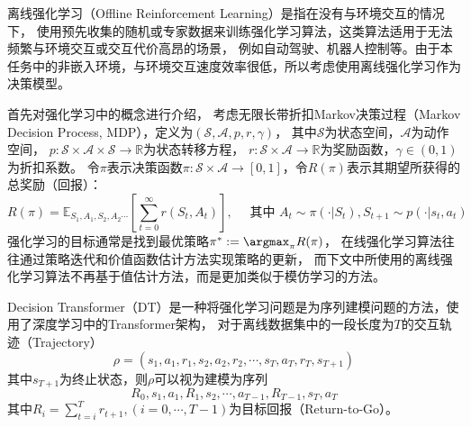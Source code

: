 
\label{sec-offline-rl}
离线强化学习（Offline Reinforcement Learning）是指在没有与环境交互的情况下，
使用预先收集的随机或专家数据来训练强化学习算法，这类算法适用于无法频繁与环境交互或交互代价高昂的场景，
例如自动驾驶、机器人控制等。由于本任务中的非嵌入环境，与环境交互速度效率很低，所以考虑使用离线强化学习作为决策模型。

首先对强化学习中的概念进行介绍，
考虑无限长带折扣Markov决策过程（Markov Decision Process, MDP），定义为$(\mathcal{S},\mathcal{A},p,r,\gamma)$，
其中$\mathcal{S}$为状态空间，$\mathcal{A}$为动作空间，
$p:\mathcal{S}\times \mathcal{A}\times \mathcal{S}\to \mathbb{R}$为状态转移方程，
$r:\mathcal{S}\times\mathcal{A}\to \mathbb{R}$为奖励函数，$\gamma\in(0,1)$为折扣系数。
令$\pi$表示决策函数$\pi: \mathcal{S}\times \mathcal{A}\to [0,1]$，令$R(\pi)$表示其期望所获得的总奖励（回报）：
\begin{equation}
  R(\pi) = \mathbb{E}_{S_1,A_1,S_2,A_2\cdots}\left[\sum_{t=0}^{\infty}r(S_t,A_t)\right],\quad
  \text{~其中~}A_t\sim\pi(\cdot|S_t),S_{t+1}\sim p(\cdot|s_t,a_t)
\end{equation}
强化学习的目标通常是找到最优策略$\pi^* := \argmax_{\pi}R(\pi)$，
在线强化学习算法往往通过策略迭代和价值函数估计方法实现策略的更新，
而下文中所使用的离线强化学习算法不再基于值估计方法，而是更加类似于模仿学习的方法。

Decision Transformer（DT）是一种将强化学习问题是为序列建模问题的方法，使用了深度学习中的Transformer架构，
对于离线数据集中的一段长度为$T$的交互轨迹（Trajectory）
\begin{equation}
  \rho = (s_1,a_1,r_1,s_2,a_2,r_2,\cdots,s_T,a_T,r_T,s_{T+1})
\end{equation}
其中$s_{T+1}$为终止状态，则$\rho$可以视为建模为序列
\begin{equation}\label{eq-sequence}
  R_0,s_1,a_1,R_1,s_2,\cdots,a_{T-1},R_{T-1},s_{T},a_{T}
\end{equation}
其中$R_i=\sum_{t=i}^Tr_{t+1}, (i=0,\cdots,T-1)$为目标回报（Return-to-Go）。

